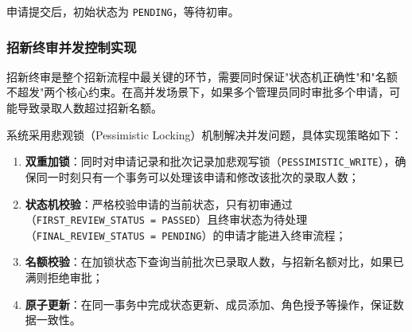 申请提交后，初始状态为 \texttt{PENDING}，等待初审。

\subsubsection{招新终审并发控制实现}

招新终审是整个招新流程中最关键的环节，需要同时保证"状态机正确性"和"名额不超发"两个核心约束。在高并发场景下，如果多个管理员同时审批多个申请，可能导致录取人数超过招新名额。

系统采用悲观锁（Pessimistic Locking）机制解决并发问题，具体实现策略如下：

\begin{enumerate}
  \item \textbf{双重加锁}：同时对申请记录和批次记录加悲观写锁（\texttt{PESSIMISTIC\_WRITE}），确保同一时刻只有一个事务可以处理该申请和修改该批次的录取人数；

  \item \textbf{状态机校验}：严格校验申请的当前状态，只有初审通过（\texttt{FIRST\_REVIEW\_STATUS = PASSED}）且终审状态为待处理（\texttt{FINAL\_REVIEW\_STATUS = PENDING}）的申请才能进入终审流程；

  \item \textbf{名额校验}：在加锁状态下查询当前批次已录取人数，与招新名额对比，如果已满则拒绝审批；

  \item \textbf{原子更新}：在同一事务中完成状态更新、成员添加、角色授予等操作，保证数据一致性。
\end{enumerate}

